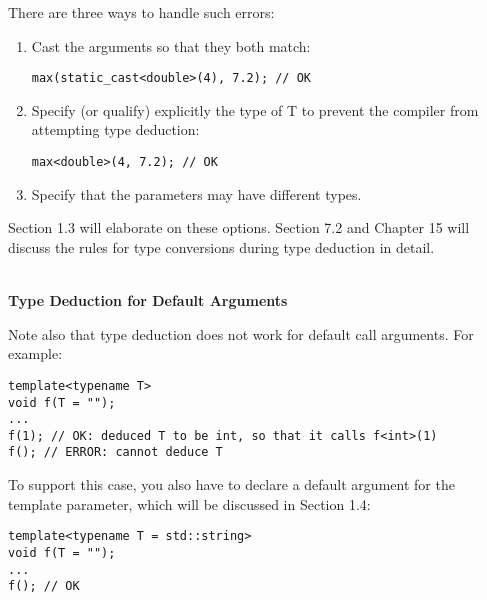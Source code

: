 There are three ways to handle such errors:

\begin{enumerate}
\item
Cast the arguments so that they both match:
\begin{lstlisting}[style=styleCXX]
max(static_cast<double>(4), 7.2); // OK
\end{lstlisting}

\item
Specify (or qualify) explicitly the type of T to prevent the compiler from attempting type deduction:
\begin{lstlisting}[style=styleCXX]
max<double>(4, 7.2); // OK
\end{lstlisting}

\item
Specify that the parameters may have different types.
\end{enumerate}

Section 1.3 will elaborate on these options. Section 7.2 and Chapter 15 will discuss the rules for type conversions during type deduction in detail.

\hspace*{\fill} \\ %
\noindent
\textbf{Type Deduction for Default Arguments}

Note also that type deduction does not work for default call arguments. For example:

\begin{lstlisting}[style=styleCXX]
template<typename T>
void f(T = "");
...
f(1); // OK: deduced T to be int, so that it calls f<int>(1)
f(); // ERROR: cannot deduce T
\end{lstlisting}

To support this case, you also have to declare a default argument for the template parameter, which will be discussed in Section 1.4:

\begin{lstlisting}[style=styleCXX]
template<typename T = std::string>
void f(T = "");
...
f(); // OK
\end{lstlisting}














